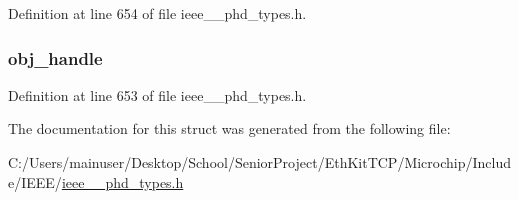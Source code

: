 Definition at line 654 of file ieee\+\_\+\_\+phd\+\_\+types.\+h.

\hypertarget{struct___set_result_simple_abbfff52b7a4956021522f5750c4b32c6}{}
\subsubsection[{obj\+\_\+handle}]{ obj\+\_\+handle}\label{struct___set_result_simple_abbfff52b7a4956021522f5750c4b32c6}


Definition at line 653 of file ieee\+\_\+\_\+phd\+\_\+types.\+h.



The documentation for this struct was generated from the following file\+:\begin{DoxyCompactItemize}
\item 
C\+:/\+Users/mainuser/\+Desktop/\+School/\+Senior\+Project/\+Eth\+Kit\+T\+C\+P/\+Microchip/\+Include/\+I\+E\+E\+E/\hyperlink{ieee__11073__phd__types_8h}{ieee\+\_\+\_\+phd\+\_\+types.\+h}\end{DoxyCompactItemize}
